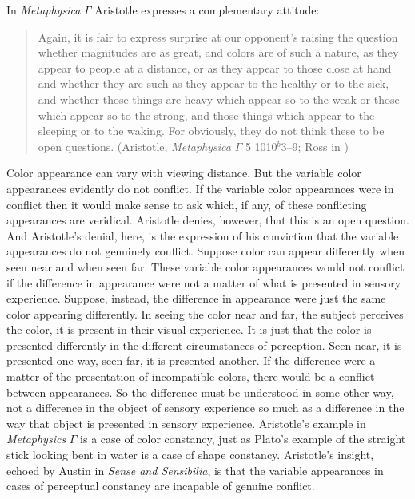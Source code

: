 In \emph{Metaphysica} \( \Gamma \) Aristotle expresses a complementary attitude:
\begin{quote}
	Again, it is fair to express surprise at our opponent's raising the question whether magnitudes are as great, and colors are of such a nature, as they appear to people at a distance, or as they appear to those close at hand and whether they are such as they appear to the healthy or to the sick, and whether those things are heavy which appear so to the weak or those which appear so to the strong, and those things which appear to the sleeping or to the waking. For obviously, they do not think these to be open questions. (Aristotle, \emph{Metaphysica} \( \Gamma \) 5 1010\( ^{b} \)3--9; Ross in \citealt[55]{Barnes:1984kx})
\end{quote}
Color appearance can vary with viewing distance. But the variable color appearances evidently do not conflict. If the variable color appearances were in conflict then it would make sense to ask which, if any, of these conflicting appearances are veridical. Aristotle denies, however, that this is an open question. And Aristotle's denial, here, is the expression of his conviction that the variable appearances do not genuinely conflict. Suppose color can appear differently when seen near and when seen far. These variable color appearances would not conflict if the difference in appearance were not a matter of what is presented in sensory experience. Suppose, instead, the difference in appearance were just the same color appearing differently. In seeing the color near and far, the subject perceives the color, it is present in their visual experience. It is just that the color is presented differently in the different circumstances of perception. Seen near, it is presented one way, seen far, it is presented another. If the difference were a matter of the presentation of incompatible colors, there would be a conflict between appearances. So the difference must be understood in some other way, not a difference in the object of sensory experience so much as a difference in the way that object is presented in sensory experience. Aristotle's example in \emph{Metaphysics} \( \Gamma \) is a case of color constancy, just as Plato's example of the straight stick looking bent in water is a case of shape constancy. Aristotle's insight, echoed by Austin in \emph{Sense and Sensibilia}, is that the variable appearances in cases of perceptual constancy are incapable of genuine conflict. 

